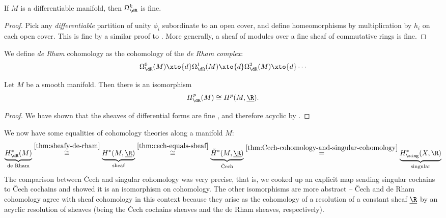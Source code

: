 \documentclass[11pt]{amsart}
\begin{document}
\begin{proposition}\label{prop:Omega-sheaves-are-fine} 
If $M$ is a differentiable manifold, then $\Omega^k_\dR$ is fine.
\end{proposition}
\begin{proof} Pick any \emph{differentiable} partition of unity $\phi_i$ subordinate to an open cover, and define homeomorphisms by multiplication by $h_i$ on each open cover. This is fine by a similar proof to . More generally, a sheaf of modules over a fine sheaf of commutative rings is fine.
\end{proof}

\begin{definition} We define \emph{de Rham} cohomology as the cohomology of the \emph{de Rham complex}:
\begin{align*}
    \Omega^0_\dR(M) \xto{d} \Omega^1_{\dR}(M) \xto{d} \Omega^2_\dR(M) \xto{d} \cdots
\end{align*}
\end{definition}

\begin{theorem}
\label{thm:sheafy-de-rham}
 Let $M$ be a smooth manifold. Then there is an isomorphism
\begin{align*}
    H^p_\dR(M) \cong H^p(M,\underline{\R}).
\end{align*}
\end{theorem}
\begin{proof}
We have shown that the sheaves of differential forms are fine , and therefore acyclic by .
\end{proof}

We now have some equalities of cohomology theories along a manifold $M$:
\begin{align*}
    \underbrace{H^\ast_\dR(M)}_{\text{de Rham}} \overset{\ref{thm:sheafy-de-rham}}{\cong} \underbrace{H^\ast(M,\underline{\R})}_{\text{sheaf}} \overset{\ref{thm:cech-equals-sheaf}}{\cong} \underbrace{\check{H}^\ast(M,\underline{\R})}_{\text{\v{C}ech}} \overset{\ref{thm:Cech-cohomology-and-singular-cohomology}}{=} \underbrace{H^\ast_\sing(X,\R)}_{\text{singular}}
\end{align*}
%
The comparison between \v{C}ech and singular cohomology was very precise, that is, we cooked up an explicit map sending singular cochains to \v{C}ech cochains and showed it is an isomorphism on cohomology. The other isomorphisms are more abstract -- \v{C}ech and de Rham cohomology agree with sheaf cohomology in this context because they arise as the cohomology of a resolution of a constant sheaf $\underline{\R}$ by an acyclic resolution of sheaves (being the \v{C}ech cochains sheaves and the de Rham sheaves, respectively).
\end{document}
